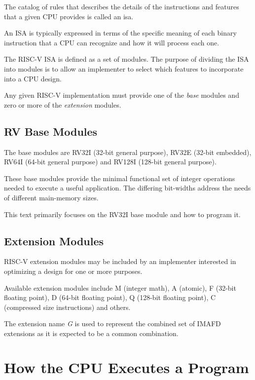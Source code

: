 The catalog of rules that describes the details of the instructions
and features that a given CPU provides is called an \acrfull{isa}.

An ISA is typically expressed in terms of the specific meaning of
each binary instruction that a CPU can recognize and how it will
process each one.

The RISC-V ISA is defined as a set of modules.  The purpose of
dividing the ISA into modules is to allow an implementer to select which
features to incorporate into a CPU design.\cite[p.~4]{rvismv1v22:2017}

Any given RISC-V implementation must provide one of the {\em base}
modules and zero or more of the {\em extension} modules.\cite[p.~4]{rvismv1v22:2017}

\subsection{RV Base Modules}

The base modules are RV32I (32-bit general purpose),
RV32E (32-bit embedded), RV64I (64-bit general purpose)
and RV128I (128-bit general purpose).\cite[p.~4]{rvismv1v22:2017}

These base modules provide the minimal functional set of integer operations
needed to execute a useful application.  The differing bit-widths address
the needs of different main-memory sizes.

This text primarily focuses on the RV32I base module and how to program it.


\subsection{Extension Modules}

RISC-V extension modules may be included by an implementer interested
in optimizing a design for one or more purposes.\cite[p.~4]{rvismv1v22:2017}

%
%
%
%
%
%
Available extension modules include M (integer math), A (atomic),
F (32-bit floating point), D (64-bit floating point),
Q (128-bit floating point), C (compressed size instructions) and others.

%
The extension name {\em G} is used to represent the combined set of IMAFD
extensions as it is expected to be a common combination.



\section{How the CPU Executes a Program}

